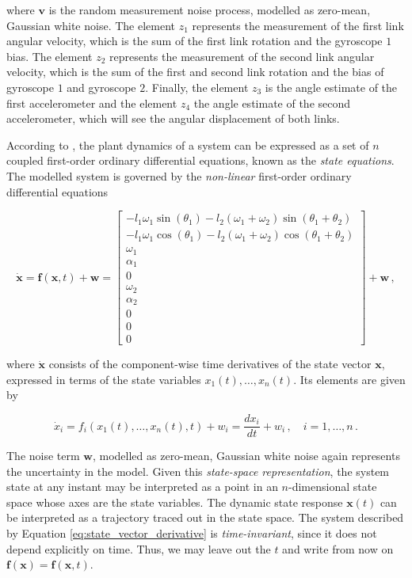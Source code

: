 \noindent
where $\mathbf{v}$ is the random measurement noise process, modelled as zero-mean, Gaussian white noise. The element $z_1$ represents the measurement of the first link angular velocity, which is the sum of the first link rotation and the gyroscope $1$ bias. The element $z_2$ represents the measurement of the second link angular velocity, which is the sum of the first and second link rotation and the bias of gyroscope $1$ and gyroscope $2$. Finally, the element $z_3$ is the angle estimate of the first accelerometer and the element $z_4$ the angle estimate of the second accelerometer, which will see the angular displacement of both links.

According to  \citeauthor{rowell2002state} \cite{rowell2002state}, the plant dynamics of a system can be expressed as a set of $n$ coupled first-order ordinary differential equations, known as the \emph{state equations}. The modelled system is governed by the \emph{non-linear} first-order ordinary differential equations

\begin{equation} \label{eq:state_vector_derivative}
  \dot{\mathbf{x}} = \mathbf{f}(\mathbf{x}, t) + \mathbf{w} = \left[\begin{smallmatrix}
  -l_1 \omega_1 \sin(\theta_1)  - l_2 (\omega_1 + \omega_2) \sin(\theta_1 + \theta_2) \\
  -l_1 \omega_1 \cos(\theta_1)  - l_2 (\omega_1 + \omega_2) \cos(\theta_1 + \theta_2) \\ \omega_1 \\ \alpha_1 \\ 0 \\ \omega_2 \\ \alpha_2 \\ 0 \\ 0 \\ 0
  \end{smallmatrix}\right] + \mathbf{w}\,,
\end{equation}

\noindent
where $\dot{\mathbf{x}}$ consists of the component-wise time derivatives of the state vector $\mathbf{x}$, expressed in terms of the state variables $x_1(t), \dots, x_n(t)$. Its elements are given by

\begin{equation}
  \dot{x}_i = f_i(x_1(t), \dots, x_n(t), t) + w_i = \frac{dx_i}{dt} + w_i\,, \quad i = 1, \dots, n\,.
\end{equation}

\noindent
The noise term $\mathbf{w}$, modelled as zero-mean, Gaussian white noise again represents the uncertainty in the model. Given this \emph{state-space representation}, the system state at any instant may be interpreted as a point in an $n$-dimensional state space whose axes are the state variables. The dynamic state response $\mathbf{x}(t)$ can be interpreted as a trajectory traced out in the state space. The system described by Equation \ref{eq:state_vector_derivative} is \emph{time-invariant}, since it does not depend explicitly on time. Thus, we may leave out the $t$ and write from now on $\mathbf{f}(\mathbf{x}) = \mathbf{f}(\mathbf{x}, t)$.

